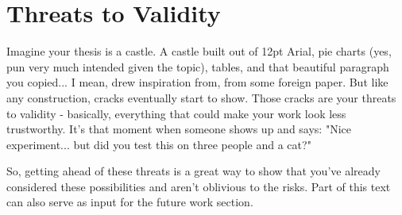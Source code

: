 \chapter{Threats to Validity}
\label{chap:ameacas_validade}

Imagine your thesis is a castle. A castle built out of 12pt Arial, pie charts (yes, pun very much intended given the topic), tables, and that beautiful paragraph you copied... I mean, drew inspiration from, from some foreign paper. But like any construction, cracks eventually start to show. Those cracks are your threats to validity - basically, everything that could make your work look less trustworthy. It's that moment when someone shows up and says: "Nice experiment... but did you test this on three people and a cat?"

So, getting ahead of these threats is a great way to show that you've already considered these possibilities and aren't oblivious to the risks. Part of this text can also serve as input for the future work section.
